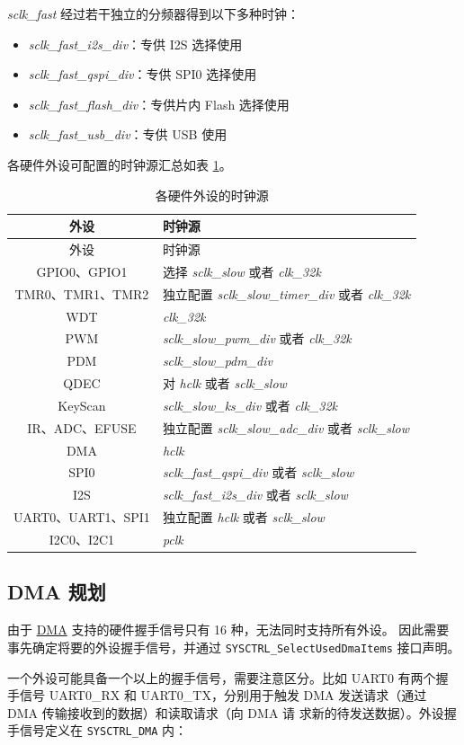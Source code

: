 \documentclass[
  12pt,
]{book}
\providecommand{\tightlist}{%
  \setlength{\itemsep}{0pt}\setlength{\parskip}{0pt}}
\begin{document}
\begin{enumerate}
  \emph{sclk\_fast} 经过若干独立的分频器得到以下多种时钟：

  \begin{itemize}
  \tightlist
  \item
    \emph{sclk\_fast\_i2s\_div}：专供 I2S 选择使用
  \item
    \emph{sclk\_fast\_qspi\_div}：专供 SPI0 选择使用
  \item
    \emph{sclk\_fast\_flash\_div}：专供片内 Flash 选择使用
  \item
    \emph{sclk\_fast\_usb\_div}：专供 USB 使用
  \end{itemize}
\end{enumerate}

各硬件外设可配置的时钟源汇总如表 \ref{tab:ch-sysctrl-tab-clk}。

\begin{longtable}[]{@{}cl@{}}
\caption{\label{tab:ch-sysctrl-tab-clk} 各硬件外设的时钟源}\tabularnewline
\toprule
外设 & 时钟源\tabularnewline
\midrule
\endfirsthead
\toprule
外设 & 时钟源\tabularnewline
\midrule
\endhead
GPIO0、GPIO1 & 选择 \emph{sclk\_slow} 或者 \emph{clk\_32k}\tabularnewline
TMR0、TMR1、TMR2 & 独立配置 \emph{sclk\_slow\_timer\_div} 或者 \emph{clk\_32k}\tabularnewline
WDT & \emph{clk\_32k}\tabularnewline
PWM & \emph{sclk\_slow\_pwm\_div} 或者 \emph{clk\_32k}\tabularnewline
PDM & \emph{sclk\_slow\_pdm\_div}\tabularnewline
QDEC & 对 \emph{hclk} 或者 \emph{sclk\_slow}\tabularnewline
KeyScan & \emph{sclk\_slow\_ks\_div} 或者 \emph{clk\_32k}\tabularnewline
IR、ADC、EFUSE & 独立配置 \emph{sclk\_slow\_adc\_div} 或者 \emph{sclk\_slow}\tabularnewline
DMA & \emph{hclk}\tabularnewline
SPI0 & \emph{sclk\_fast\_qspi\_div} 或者 \emph{sclk\_slow}\tabularnewline
I2S & \emph{sclk\_fast\_i2s\_div} 或者 \emph{sclk\_slow}\tabularnewline
UART0、UART1、SPI1 & 独立配置 \emph{hclk} 或者 \emph{sclk\_slow}\tabularnewline
I2C0、I2C1 & \emph{pclk}\tabularnewline
\bottomrule
\end{longtable}

\hypertarget{dma-ux89c4ux5212}{%
\subsection{DMA 规划}\label{dma-ux89c4ux5212}}

由于 \protect\hyperlink{ch-dma}{DMA} 支持的硬件握手信号只有 16 种，无法同时支持所有外设。
因此需要事先确定将要的外设握手信号，并通过 \texttt{SYSCTRL\_SelectUsedDmaItems} 接口声明。

一个外设可能具备一个以上的握手信号，需要注意区分。比如 UART0 有两个握手信号 UART0\_RX 和
UART0\_TX，分别用于触发 DMA 发送请求（通过 DMA 传输接收到的数据）和读取请求（向 DMA 请
求新的待发送数据）。外设握手信号定义在 \texttt{SYSCTRL\_DMA} 内：
\end{document}
